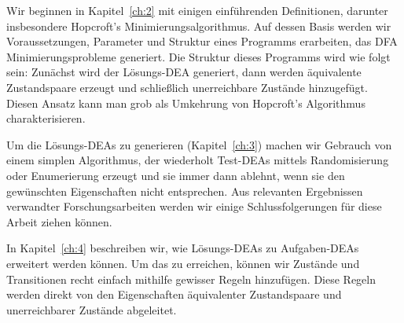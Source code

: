 Wir beginnen in Kapitel~\ref{ch:2} mit einigen einführenden Definitionen, darunter insbesondere Hopcroft's Minimierungsalgorithmus. Auf dessen Basis werden wir Voraussetzungen, Parameter und Struktur eines Programms erarbeiten, das DFA Minimierungsprobleme generiert. Die Struktur dieses Programms wird wie folgt sein: Zunächst wird der Lösungs-DEA generiert, dann werden äquivalente Zustandspaare erzeugt und schließlich unerreichbare Zustände hinzugefügt. Diesen Ansatz kann man grob als Umkehrung von Hopcroft's Algorithmus charakterisieren.

Um die Lösungs-DEAs zu generieren (Kapitel~\ref{ch:3}) machen wir Gebrauch von einem simplen Algorithmus, der wiederholt Test-DEAs mittels Randomisierung oder Enumerierung erzeugt und sie immer dann ablehnt, wenn sie den gewünschten Eigenschaften nicht entsprechen. Aus relevanten Ergebnissen verwandter Forschungsarbeiten werden wir einige Schlussfolgerungen für diese Arbeit ziehen können.

In Kapitel~\ref{ch:4} beschreiben wir, wie Lösungs-DEAs zu Aufgaben-DEAs erweitert werden können. Um das zu erreichen, können wir Zustände und Transitionen recht einfach mithilfe gewisser Regeln hinzufügen. Diese Regeln werden direkt von den Eigenschaften äquivalenter Zustandspaare und unerreichbarer Zustände abgeleitet.
	